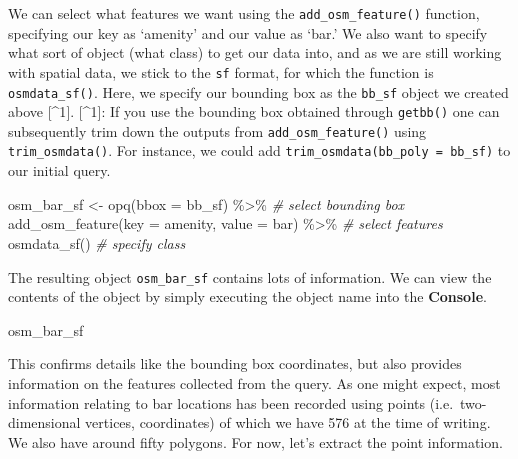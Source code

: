 \documentclass[
]{book}
\newenvironment{Shaded}{\begin{snugshade}}{\end{snugshade}}
\newcommand{\AttributeTok}[1]{\textcolor[rgb]{0.77,0.63,0.00}{#1}}
\newcommand{\CommentTok}[1]{\textcolor[rgb]{0.56,0.35,0.01}{\textit{#1}}}
\newcommand{\FunctionTok}[1]{\textcolor[rgb]{0.00,0.00,0.00}{#1}}
\newcommand{\NormalTok}[1]{#1}
\newcommand{\OtherTok}[1]{\textcolor[rgb]{0.56,0.35,0.01}{#1}}
\newcommand{\SpecialCharTok}[1]{\textcolor[rgb]{0.00,0.00,0.00}{#1}}
\newcommand{\StringTok}[1]{\textcolor[rgb]{0.31,0.60,0.02}{#1}}
\begin{document}
We can select what features we want using the \texttt{add\_osm\_feature()} function, specifying our key as `amenity' and our value as `bar.' We also want to specify what sort of object (what class) to get our data into, and as we are still working with spatial data, we stick to the \texttt{sf} format, for which the function is \texttt{osmdata\_sf()}. Here, we specify our bounding box as the \texttt{bb\_sf} object we created above {[}\^{}1{]}. {[}\^{}1{]}: If you use the bounding box obtained through \texttt{getbb()} one can subsequently trim down the outputs from \texttt{add\_osm\_feature()} using \texttt{trim\_osmdata()}. For instance, we could add \texttt{trim\_osmdata(bb\_poly\ =\ bb\_sf)} to our initial query.

\begin{Shaded}
\begin{Highlighting}[]
\NormalTok{osm\_bar\_sf }\OtherTok{\textless{}{-}} \FunctionTok{opq}\NormalTok{(}\AttributeTok{bbox =}\NormalTok{ bb\_sf) }\SpecialCharTok{\%\textgreater{}\%}    \CommentTok{\# select bounding box}
  \FunctionTok{add\_osm\_feature}\NormalTok{(}\AttributeTok{key =} \StringTok{\textquotesingle{}amenity\textquotesingle{}}\NormalTok{, }\AttributeTok{value =} \StringTok{\textquotesingle{}bar\textquotesingle{}}\NormalTok{) }\SpecialCharTok{\%\textgreater{}\%} \CommentTok{\# select features}
  \FunctionTok{osmdata\_sf}\NormalTok{()          }\CommentTok{\# specify class}
\end{Highlighting}
\end{Shaded}

The resulting object \texttt{osm\_bar\_sf} contains lots of information. We can view the contents of the object by simply executing the object name into the \textbf{Console}.

\begin{Shaded}
\begin{Highlighting}[]
\NormalTok{osm\_bar\_sf}
\end{Highlighting}
\end{Shaded}

This confirms details like the bounding box coordinates, but also provides information on the features collected from the query. As one might expect, most information relating to bar locations has been recorded using points (i.e.~two-dimensional vertices, coordinates) of which we have 576 at the time of writing. We also have around fifty polygons. For now, let's extract the point information.

\begin{Shaded}
\end{Shaded}
\end{document}
